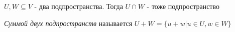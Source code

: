 \bigskip


\begin{proposal}
    
    $U, W \subseteq V$ - два подпространства. Тогда $U \cap W$ - тоже подпространство

\end{proposal}


\bigskip


\begin{definition}
    
    \textit{Суммой двух подпространств} называется $U + W = \{u + w | u \in U, w \in W\}$

\end{definition}


\bigskip


\begin{comment}

    Так как $U \cap W \subseteq U = U + \{0\} \subseteq U + W$, то $\dim U \cap W \leq \dim U \leq \dim U + W$

\end{comment}


\bigskip


